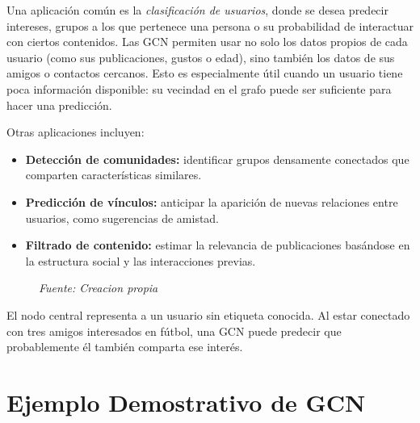 \documentclass[11pt]{article} %
\begin{document}
Una aplicación común es la \textit{clasificación de usuarios}, donde se desea predecir intereses, grupos a los que pertenece una persona o su probabilidad de interactuar con ciertos contenidos. Las GCN permiten usar no solo los datos propios de cada usuario (como sus publicaciones, gustos o edad), sino también los datos de sus amigos o contactos cercanos. Esto es especialmente útil cuando un usuario tiene poca información disponible: su vecindad en el grafo puede ser suficiente para hacer una predicción.

Otras aplicaciones incluyen:

\begin{itemize}
    \item \textbf{Detección de comunidades:} identificar grupos densamente conectados que comparten características similares.
    \item \textbf{Predicción de vínculos:} anticipar la aparición de nuevas relaciones entre usuarios, como sugerencias de amistad.
    \item \textbf{Filtrado de contenido:} estimar la relevancia de publicaciones basándose en la estructura social y las interacciones previas.
\end{itemize}

\begin{figure}[H]
    \centering
    \caption*{
    \textit{Fuente: Creacion propia}
    }
\end{figure}

\vspace{0.5em}
El nodo central representa a un usuario sin etiqueta conocida. Al estar conectado con tres amigos interesados en fútbol, una GCN puede predecir que probablemente él también comparta ese interés.

\newpage 
{\section{Ejemplo Demostrativo de GCN }} \vspace{10pt}
\end{document}
